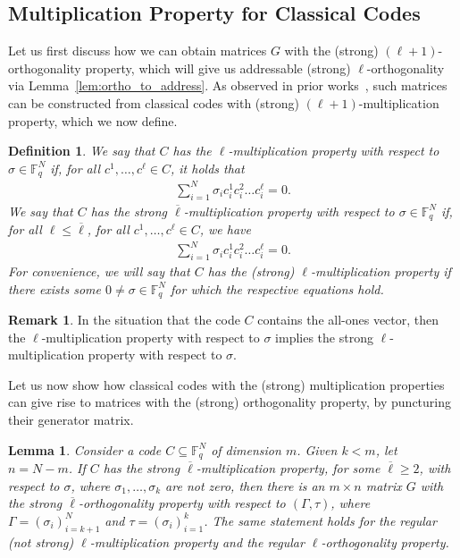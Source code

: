 \documentclass[11pt]{article}
\newtheorem{lemma}[theorem]{Lemma}
\newtheorem{definition}[theorem]{Definition}
\theoremstyle{definition}
\newtheorem{remark}[theorem]{Remark}
\renewcommand{\le}{\leqslant}
\renewcommand{\geq}{\geqslant}
\newcommand{\bbF}{\mathbb{F}}
\newcommand*{\ol}{\overline}
\begin{document}
\subsection{Multiplication Property for Classical Codes}\label{sec:classical_code_multiplication}
Let us first discuss how we can obtain matrices $G$ with the (strong) $(\ell+1)$-orthogonality property, which will give us addressable (strong) $\ell$-orthogonality via Lemma~\ref{lem:ortho_to_address}. As observed in prior works~\cite{hastings2018distillation,krishna2019towards,wills2024constant,nguyen2024goodbinaryquantumcodes,golowich2024asymptoticallygoodquantumcodes,nguyen2024quantum}, such matrices can be constructed from classical codes with (strong) $(\ell+1)$-multiplication property, which we now define.





\begin{definition}\label{def:multiplication_property}
    We say that $C$ has the $\ell$-multiplication property with respect to $\sigma \in \bbF_q^N$ if, for all $c^1, \dots, c^\ell \in C$, it holds that
    \begin{align}
        \sum_{i = 1}^N \sigma_i c^1_i c^2_i \dots c^\ell_i = 0.
    \end{align}
    We say that $C$ has the strong $\ol{\ell}$-multiplication property with respect to $\sigma \in \bbF_q^N$ if, for all $\ell \le \ol{\ell}$, for all $c^1, \ldots, c^\ell \in C$, we have
    \begin{align}
        \sum_{i=1}^N \sigma_i c^1_i c^2_i \dots c^{\ell}_i = 0.
    \end{align}
    For convenience, we will say that $C$ has the (strong) $\ell$-multiplication property if there exists some $0 \neq \sigma \in \bbF_q^N$ for which the respective equations hold.
\end{definition}
\begin{remark}\label{rmk:all_ones_mult}
    In the situation that the code $C$ contains the all-ones vector, then the $\ell$-multiplication property with respect to $\sigma$ implies the strong $\ell$-multiplication property with respect to $\sigma$.
\end{remark}
Let us now show how classical codes with the (strong) multiplication properties can give rise to matrices with the (strong) orthogonality property, by puncturing their generator matrix.




\begin{lemma}\label{lem:mult_to_ortho}
    Consider a code $C \subseteq \mathbb{F}_q^N$ of dimension $m$. Given $k < m$, let $n = N-m$. If $C$ has the strong $\ol{\ell}$-multiplication property, for some $\ol{\ell} \geq 2$, with respect to $\sigma$, where $\sigma_1, \ldots, \sigma_k$ are not zero, then there is an $m \times n$ matrix $G$ with the strong $\ol{\ell}$-orthogonality property with respect to $(\Gamma,\tau)$, where $\Gamma = (\sigma_i)_{i=k+1}^N$ and $\tau = (\sigma_i)_{i=1}^k$. The same statement holds for the regular (not strong) $\ell$-multiplication property and the regular $\ell$-orthogonality property.
\end{lemma}
\end{document}
